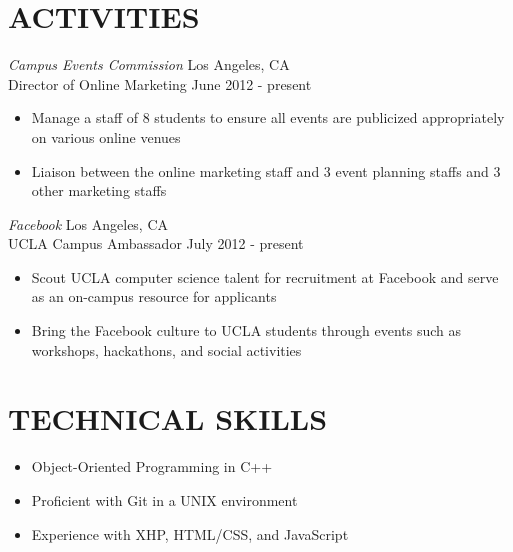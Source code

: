 \documentclass{res}
\begin{document}
\begin{resume}
\section{ACTIVITIES}
\vspace{6pt}
  {\sl Campus Events Commission} \hfill Los Angeles, CA \\
  Director of Online Marketing \hfill June 2012 - present
  \begin{itemize} \itemsep -2pt
    \item Manage a staff of 8 students to ensure all events are publicized appropriately on various online venues
    \item Liaison between the online marketing staff and 3 event planning staffs and 3 other marketing staffs
  \end{itemize} \vspace{-6pt}

  {\sl Facebook} \hfill Los Angeles, CA \\
  UCLA Campus Ambassador \hfill July 2012 - present
  \begin{itemize} \itemsep -2pt
    \item Scout UCLA computer science talent for recruitment at Facebook and serve as an on-campus resource for applicants
    \item Bring the Facebook culture to UCLA students through events such as workshops,  hackathons, and social activities
  \end{itemize} \vspace{-6pt}

\section{TECHNICAL SKILLS}
\vspace{0.2in}
  \begin{itemize}  \itemsep -2pt
    \item Object-Oriented Programming in C++
    \item Proficient with Git in a UNIX environment
    \item Experience with XHP, HTML/CSS, and JavaScript
  \end{itemize}
\end{resume}
\end{document}
